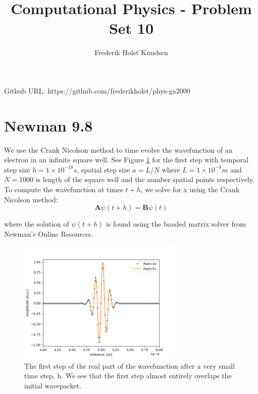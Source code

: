 \documentclass[11pt]{article}
\title{Computational Physics -  Problem Set 10}
\author{Frederik Holst Knudsen}
\begin{document}
\maketitle
Github URL: https://github.com/frederikholst/phys-ga2000
\section{Newman 9.8}
We use the Crank Nicolson method to time evolve the wavefunction of an electron in an infinite square well. See Figure \ref{one} for the first step with temporal step size $h=1\times 10^{-18}s$, spatial step size $a=L/N$ where $L=1\times 10^{-8}m$ and $N=1000$ is length of the square well and the number spatial points respectively. To compute the wavefunction at times $t+h$, we solve for x using the Crank Nicolson method: 
\begin{equation}
\mathbf{A}\psi(t+h)=\mathbf{B}\psi(t)
\end{equation}

where the solution of $\psi(t+h)$ is found using the banded matrix solver from Newman's Online Resources. 

\begin{figure}[!htbp]
    \centering
    \includegraphics[width=0.7\textwidth]{One Step.png}
    \caption{The first step of the real part of the wavefunction after a very small time step, h. We see that the first step almost entirely overlaps the initial wavepacket.}
    \label{one}
\end{figure}
\end{document}
